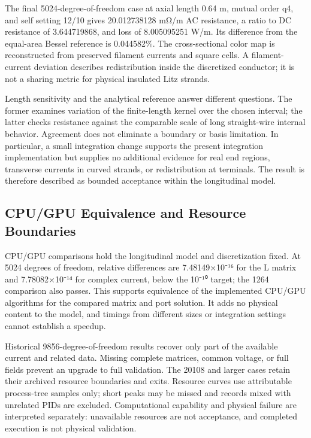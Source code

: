 \documentclass[journal,10pt]{IEEEtran}
\begin{document}
The final 5024-degree-of-freedom case at axial length 0.64 m, mutual order q4, and self setting 12/10 gives 20.012738128 mΩ/m AC resistance, a ratio to DC resistance of 3.644719868, and loss of 8.005095251 W/m. Its difference from the equal-area Bessel reference is 0.044582\%. The cross-sectional color map is reconstructed from preserved filament currents and square cells. A filament-current deviation describes redistribution inside the discretized conductor; it is not a sharing metric for physical insulated Litz strands.


Length sensitivity and the analytical reference answer different questions. The former examines variation of the finite-length kernel over the chosen interval; the latter checks resistance against the comparable scale of long straight-wire internal behavior. Agreement does not eliminate a boundary or basis limitation. In particular, a small integration change supports the present integration implementation but supplies no additional evidence for real end regions, transverse currents in curved strands, or redistribution at terminals. The result is therefore described as bounded acceptance within the longitudinal model.


\subsection*{CPU/GPU Equivalence and Resource Boundaries}
\hypertarget{03.compute.heading}{}
CPU/GPU comparisons hold the longitudinal model and discretization fixed. At 5024 degrees of freedom, relative differences are 7.48149×10⁻¹⁶ for the L matrix and 7.78082×10⁻¹⁴ for complex current, below the 10⁻¹⁰ target; the 1264 comparison also passes. This supports equivalence of the implemented CPU/GPU algorithms for the compared matrix and port solution. It adds no physical content to the model, and timings from different sizes or integration settings cannot establish a speedup.


Historical 9856-degree-of-freedom results recover only part of the available current and related data. Missing complete matrices, common voltage, or full fields prevent an upgrade to full validation. The 20108 and larger cases retain their archived resource boundaries and exits. Resource curves use attributable process-tree samples only; short peaks may be missed and records mixed with unrelated PIDs are excluded. Computational capability and physical failure are interpreted separately: unavailable resources are not acceptance, and completed execution is not physical validation.
\end{document}

